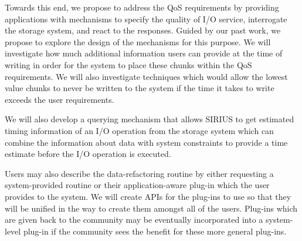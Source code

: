 Towards this end, we propose to
address the QoS requirements by providing applications with mechanisms to
specify the quality of I/O service, interrogate the storage system, and react
to the responses. Guided by our past work, we propose to explore the design of
the mechanisms for this purpose.  %
We will investigate how much additional information users
can provide at the time of writing in order for the system to place these chunks within
the QoS requirements. We will also investigate techniques which would allow the lowest
value chunks to never be written to the system if the time it takes to write exceeds the user
requirements.

We will also develop a querying mechanism that allows SIRIUS
to get estimated timing information of an I/O operation from the storage
system which can combine the information about data with system constraints
to provide a time estimate before the I/O operation is executed. 



Users may also describe the data-refactoring routine by either requesting a system-provided
routine or their application-aware plug-in which the user provides to the system. We will
create APIs for the plug-ins to use so that they will be unified in the way to create them
amongst all of the users. Plug-ins which are given back to the community may be 
eventually incorporated into a system-level plug-in if the community sees the benefit for
these more general plug-ins.

